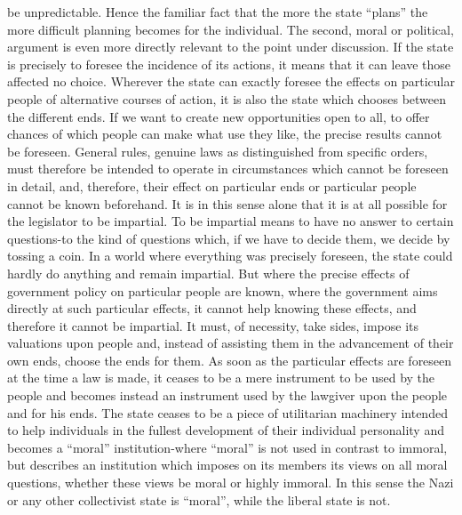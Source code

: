 \documentclass[11pt,openany]{book}
\begin{document}
be unpredictable. Hence the familiar fact that the more the state ``plans'' the more difficult planning becomes for the individual. The second, moral or political, argument is even more directly relevant to the point under discussion. If the state is precisely to foresee the incidence of its actions, it means that it can leave those affected no choice. Wherever the state can exactly foresee the effects on particular people of alternative courses of action, it is also the state which chooses between the different ends. If we want to create new opportunities open to all, to offer chances of which people can make what use they like, the precise results cannot be foreseen. General rules, genuine laws as distinguished from specific orders, must therefore be intended to operate in circumstances which cannot be foreseen in detail, and, therefore, their effect on particular ends or particular people cannot be known beforehand. It is in this sense alone that it is at all possible for the legislator to be impartial. To be impartial means to have no answer to certain questions-to the kind of questions which, if we have to decide them, we decide by tossing a coin. In a world where everything was precisely foreseen, the state could hardly do anything and remain impartial. But where the precise effects of government policy on particular people are known, where the government aims directly at such particular effects, it cannot help knowing these effects, and therefore it cannot be impartial. It must, of necessity, take sides, impose its valuations upon people and, instead of assisting them in the advancement of their own ends, choose the ends for them. As soon as the particular effects are foreseen at the time a law is made, it ceases to be a mere instrument to be used by the people and becomes instead an instrument used by the lawgiver upon the people and for his ends. The state ceases to be a piece of utilitarian machinery intended to help individuals in the fullest development of their individual personality and becomes a ``moral'' institution-where ``moral'' is not used in contrast to immoral, but describes an institution which imposes on its members its views on all moral questions, whether these views be moral or highly immoral. In this sense the Nazi or any other collectivist state is ``moral'', while the liberal state is not.
\end{document}
